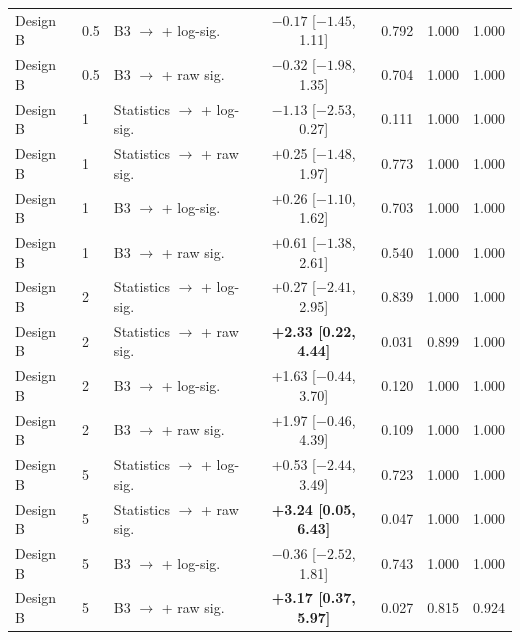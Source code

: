 \begin{tabular}{@{}lllcccc@{}}
Design B & 0.5 & B3 $\to$ + log-sig. & $-0.17$ [$-1.45$, 1.11] & 0.792 & 1.000 & 1.000 \\
Design B & 0.5 & B3 $\to$ + raw sig. & $-0.32$ [$-1.98$, 1.35] & 0.704 & 1.000 & 1.000 \\
Design B & 1 & Statistics $\to$ + log-sig. & $-1.13$ [$-2.53$, 0.27] & 0.111 & 1.000 & 1.000 \\
Design B & 1 & Statistics $\to$ + raw sig. & +0.25 [$-1.48$, 1.97] & 0.773 & 1.000 & 1.000 \\
Design B & 1 & B3 $\to$ + log-sig. & +0.26 [$-1.10$, 1.62] & 0.703 & 1.000 & 1.000 \\
Design B & 1 & B3 $\to$ + raw sig. & +0.61 [$-1.38$, 2.61] & 0.540 & 1.000 & 1.000 \\
Design B & 2 & Statistics $\to$ + log-sig. & +0.27 [$-2.41$, 2.95] & 0.839 & 1.000 & 1.000 \\
Design B & 2 & Statistics $\to$ + raw sig. & \textbf{\boldmath +2.33 [0.22, 4.44]} & 0.031 & 0.899 & 1.000 \\
Design B & 2 & B3 $\to$ + log-sig. & +1.63 [$-0.44$, 3.70] & 0.120 & 1.000 & 1.000 \\
Design B & 2 & B3 $\to$ + raw sig. & +1.97 [$-0.46$, 4.39] & 0.109 & 1.000 & 1.000 \\
Design B & 5 & Statistics $\to$ + log-sig. & +0.53 [$-2.44$, 3.49] & 0.723 & 1.000 & 1.000 \\
Design B & 5 & Statistics $\to$ + raw sig. & \textbf{\boldmath +3.24 [0.05, 6.43]} & 0.047 & 1.000 & 1.000 \\
Design B & 5 & B3 $\to$ + log-sig. & $-0.36$ [$-2.52$, 1.81] & 0.743 & 1.000 & 1.000 \\
Design B & 5 & B3 $\to$ + raw sig. & \textbf{\boldmath +3.17 [0.37, 5.97]} & 0.027 & 0.815 & 0.924 \\
\bottomrule
\end{tabular}
